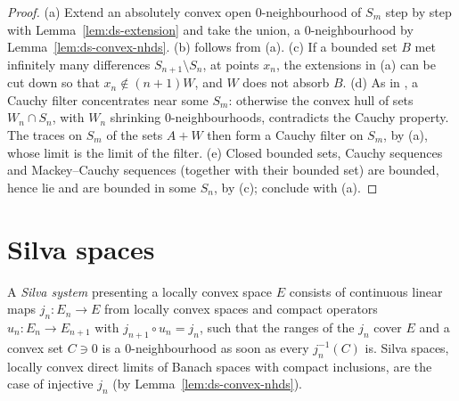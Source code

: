 \begin{proof}
  \leanok
  (a) Extend an absolutely convex open $0$-neighbourhood of $S_m$ step by step with
  Lemma~\ref{lem:ds-extension} and take the union, a $0$-neighbourhood by
  Lemma~\ref{lem:ds-convex-nhds}. (b) follows from (a). (c) If a bounded set $B$ met infinitely
  many differences $S_{n+1} \setminus S_n$, at points $x_n$, the extensions in (a) can be cut down
  so that $x_n \notin (n+1) W$, and $W$ does not absorb $B$. (d) As in \cite{GN26}, a Cauchy filter
  concentrates near some $S_m$: otherwise the convex hull of sets $W_n \cap S_n$, with $W_n$
  shrinking $0$-neighbourhoods, contradicts the Cauchy property. The traces on $S_m$ of the sets
  $A + W$ then form a Cauchy filter on $S_m$, by (a), whose limit is the limit of the filter.
  (e) Closed bounded sets, Cauchy sequences and Mackey--Cauchy sequences (together with their
  bounded set) are bounded, hence lie and are bounded in some $S_n$, by (c); conclude with (a).
\end{proof}

\section{Silva spaces}

\begin{definition}
  \label{def:ds-silva}
  \leanok
  A \emph{Silva system} presenting a locally convex space $E$ consists of continuous linear maps
  $j_n \colon E_n \to E$ from locally convex spaces and compact operators
  $u_n \colon E_n \to E_{n+1}$ with $j_{n+1} \circ u_n = j_n$, such that the ranges of the $j_n$
  cover $E$ and a convex set $C \ni 0$ is a $0$-neighbourhood as soon as every $j_n^{-1}(C)$ is.
  Silva spaces, locally convex direct limits of Banach spaces with compact inclusions, are the case
  of injective $j_n$ (by Lemma~\ref{lem:ds-convex-nhds}).
\end{definition}


